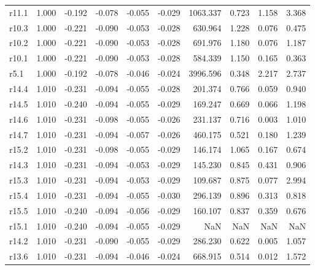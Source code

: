 \begin{longtable}{lrrrrrrrrr}
r11.1 &     1.000 &   -0.192 &   -0.078 &  -0.055 &  -0.029 &    1063.337 &    0.723 &        1.158 &       3.368 \\
r10.3 &     1.000 &   -0.221 &   -0.090 &  -0.053 &  -0.028 &     630.964 &    1.228 &        0.076 &       0.475 \\
r10.2 &     1.000 &   -0.221 &   -0.090 &  -0.053 &  -0.028 &     691.976 &    1.180 &        0.076 &       1.187 \\
r10.1 &     1.000 &   -0.221 &   -0.090 &  -0.053 &  -0.028 &     584.339 &    1.150 &        0.165 &       0.363 \\
 r5.1 &     1.000 &   -0.192 &   -0.078 &  -0.046 &  -0.024 &    3996.596 &    0.348 &        2.217 &       2.737 \\
r14.4 &     1.010 &   -0.231 &   -0.094 &  -0.055 &  -0.028 &     201.374 &    0.766 &        0.059 &       0.940 \\
r14.5 &     1.010 &   -0.240 &   -0.094 &  -0.055 &  -0.029 &     169.247 &    0.669 &        0.066 &       1.198 \\
r14.6 &     1.010 &   -0.231 &   -0.098 &  -0.055 &  -0.026 &     231.137 &    0.716 &        0.003 &       1.010 \\
r14.7 &     1.010 &   -0.231 &   -0.094 &  -0.057 &  -0.026 &     460.175 &    0.521 &        0.180 &       1.239 \\
r15.2 &     1.010 &   -0.231 &   -0.098 &  -0.055 &  -0.029 &     146.174 &    1.065 &        0.167 &       0.674 \\
r14.3 &     1.010 &   -0.231 &   -0.094 &  -0.053 &  -0.029 &     145.230 &    0.845 &        0.431 &       0.906 \\
r15.3 &     1.010 &   -0.231 &   -0.094 &  -0.053 &  -0.029 &     109.687 &    0.875 &        0.077 &       2.994 \\
r15.4 &     1.010 &   -0.231 &   -0.094 &  -0.055 &  -0.030 &     296.139 &    0.896 &        0.313 &       0.818 \\
r15.5 &     1.010 &   -0.240 &   -0.094 &  -0.056 &  -0.029 &     160.107 &    0.837 &        0.359 &       0.676 \\
r15.1 &     1.010 &   -0.240 &   -0.094 &  -0.055 &  -0.029 &         NaN &      NaN &          NaN &         NaN \\
r14.2 &     1.010 &   -0.231 &   -0.090 &  -0.055 &  -0.029 &     286.230 &    0.622 &        0.005 &       1.057 \\
r13.6 &     1.010 &   -0.231 &   -0.094 &  -0.046 &  -0.024 &     668.915 &    0.514 &        0.012 &       1.572 \\

\end{longtable}
